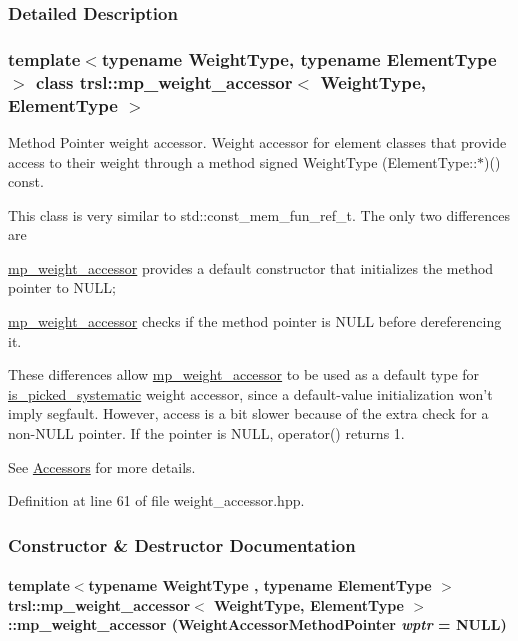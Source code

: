 \subsubsection{Detailed Description}
\subsubsection*{template$<$typename WeightType, typename ElementType$>$ class trsl::mp\_\-weight\_\-accessor$<$ WeightType, ElementType $>$}

Method Pointer weight accessor. Weight accessor for element classes that provide access to their weight through a method signed {\ttfamily WeightType (ElementType::$\ast$)() const}.

This class is very similar to {\ttfamily std::const\_\-mem\_\-fun\_\-ref\_\-t}. The only two differences are 
\begin{DoxyItemize}
\item \hyperlink{classtrsl_1_1mp__weight__accessor}{mp\_\-weight\_\-accessor} provides a default constructor that initializes the method pointer to NULL; 
\item \hyperlink{classtrsl_1_1mp__weight__accessor}{mp\_\-weight\_\-accessor} checks if the method pointer is NULL before dereferencing it.
\end{DoxyItemize}These differences allow \hyperlink{classtrsl_1_1mp__weight__accessor}{mp\_\-weight\_\-accessor} to be used as a default type for \hyperlink{classtrsl_1_1is__picked__systematic}{is\_\-picked\_\-systematic} weight accessor, since a default-\/value initialization won't imply segfault. However, access is a bit slower because of the extra check for a non-\/NULL pointer. If the pointer is NULL, {\ttfamily operator()} returns 1.

See \hyperlink{group__accessor}{Accessors} for more details. 

Definition at line 61 of file weight\_\-accessor.hpp.

\subsubsection{Constructor \& Destructor Documentation}
\hypertarget{classtrsl_1_1mp__weight__accessor_a11a52dfed053534bf1003a917d2ec28b}{
\paragraph[{mp\_\-weight\_\-accessor}]{\setlength{\rightskip}{0pt plus 5cm}template$<$typename WeightType , typename ElementType $>$ {\bf trsl::mp\_\-weight\_\-accessor}$<$ WeightType, ElementType $>$::{\bf mp\_\-weight\_\-accessor} ({\bf WeightAccessorMethodPointer} {\em wptr} = {\ttfamily NULL})}\hfill}
\label{classtrsl_1_1mp__weight__accessor_a11a52dfed053534bf1003a917d2ec28b}


